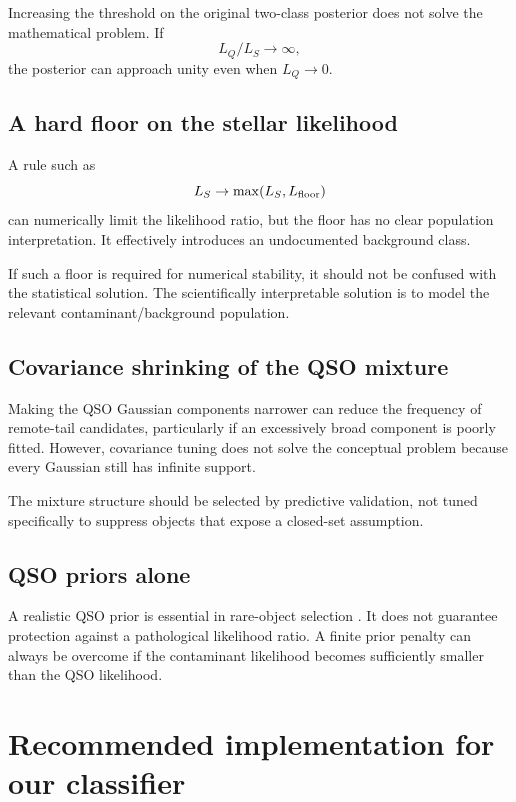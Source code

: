 \documentclass[11pt]{article}
\begin{document}
Increasing the threshold on the original two-class posterior does not solve
the mathematical problem. If
%
\begin{equation}
L_Q/L_S\rightarrow\infty,
\end{equation}
%
the posterior can approach unity even when $L_Q\rightarrow 0$.

\subsection{A hard floor on the stellar likelihood}

A rule such as
%
\begin{equation}
L_S\rightarrow\max(L_S,L_{\rm floor})
\end{equation}
%
can numerically limit the likelihood ratio, but the floor has no clear
population interpretation. It effectively introduces an undocumented
background class.

If such a floor is required for numerical stability, it should not be
confused with the statistical solution. The scientifically interpretable
solution is to model the relevant contaminant/background population.

\subsection{Covariance shrinking of the QSO mixture}

Making the QSO Gaussian components narrower can reduce the frequency of
remote-tail candidates, particularly if an excessively broad component is
poorly fitted. However, covariance tuning does not solve the conceptual
problem because every Gaussian still has infinite support.

The mixture structure should be selected by predictive validation, not tuned
specifically to suppress objects that expose a closed-set assumption.

\subsection{QSO priors alone}

A realistic QSO prior is essential in rare-object selection
\citep{bovy2011xdqso,mortlock2012}. It does not guarantee protection against
a pathological likelihood ratio. A finite prior penalty can always be
overcome if the contaminant likelihood becomes sufficiently smaller than the
QSO likelihood.

\section{Recommended implementation for our classifier}
\end{document}
